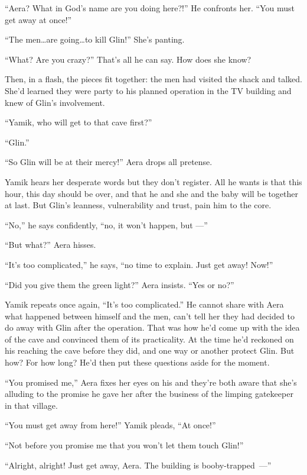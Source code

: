 \documentclass[twoside,11pt,openany]{book}
\begin{document}
``Aera? What in God's name are you doing here?!'' He confronts her. ``You must get away at
once!''

``The men{\ldots}are going{\ldots}to kill Glin!'' She's panting.

``What?{ }Are you crazy?'' That's all he can
say.  How does she know?

Then, in a flash, the pieces fit together: the men had visited the shack and talked. She'd learned they were party to
his planned operation in the TV building and knew of Glin's involvement.

``Yamik, who will get to that cave first?''

``Glin.''

``So Glin will be at their mercy!'' Aera drops all pretense.

Yamik hears her desperate words but they don't register. All he wants is that this hour, this day should be over, and
that he and she and the baby will be together at last. But Glin's leanness, vulnerability and trust, pain him to the
core{.}

 ``No,'' he says{ }confidently,
``no, it won't happen, but ---''

``But what?'' Aera hisses.

``It's too complicated,'' he says, ``no time to explain. Just get away!
Now!''

``Did you give them the green light?'' Aera insists. ``Yes or no?''

Yamik repeats once again, ``It's too complicated.'' He
cannot{ }share with Aera what happened between himself and the men, can't tell
her they had decided to do away with Glin after the operation. That was how he'd come up with the idea of the cave and
convinced them of its practicality.  At the time he'd reckoned on his reaching the cave before they did, and one way
or another protect Glin. But how? For how long? He'd then put these questions aside for the moment.

``You promised me,'' Aera fixes her eyes on his and they're both aware that she's alluding to
the promise he gave her after the business of the limping gatekeeper in that village.

``You must get away from here!'' Yamik pleads, ``At
once!''

``Not before you promise me that you won't let them touch Glin!''

``Alright, alright! Just get away, Aera{. T}he building is
booby-\linebreak[4]trapped~---''
\end{document}
